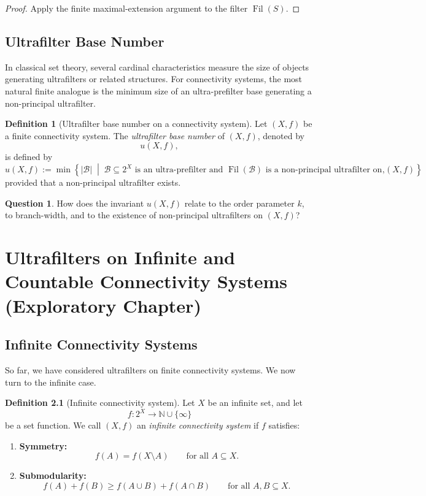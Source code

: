 \documentclass[10pt]{book}
\theoremstyle{definition}
\newtheorem{definition}[theorem]{Definition}
\newtheorem{question}[theorem]{Question}
\begin{document}
\begin{proof}
Apply the finite maximal-extension argument to the filter \(\operatorname{Fil}(S)\).
\end{proof}

\section{Ultrafilter Base Number}

In classical set theory, several cardinal characteristics measure the size of objects generating ultrafilters or related structures.
For connectivity systems, the most natural finite analogue is the minimum size of an ultra-prefilter base generating a non-principal ultrafilter.

\begin{definition}[Ultrafilter base number on a connectivity system]
Let \((X,f)\) be a finite connectivity system.
The \emph{ultrafilter base number} of \((X,f)\), denoted by
\[
u(X,f),
\]
is defined by
\[
u(X,f)
:=
\min
\left\{
|\mathcal{B}|
\;\middle|\;
\mathcal{B}\subseteq 2^X
\text{ is an ultra-prefilter and }
\operatorname{Fil}(\mathcal{B})
\text{ is a non-principal ultrafilter on }(X,f)
\right\},
\]
provided that a non-principal ultrafilter exists.
\end{definition}

\begin{question}
How does the invariant \(u(X,f)\) relate to the order parameter \(k\), to branch-width, and to the existence of non-principal ultrafilters on \((X,f)\)?
\end{question}

\newpage

\chapter{Ultrafilters on Infinite and Countable Connectivity Systems
(Exploratory Chapter) }

\section{Infinite Connectivity Systems}
So far, we have considered ultrafilters on finite connectivity systems.
We now turn to the infinite case.

\begin{definition}[Infinite connectivity system]
\label{def:infinite_connectivity_system}
Let \(X\) be an infinite set, and let
\[
f:2^X \to \mathbb{N}\cup\{\infty\}
\]
be a set function.
We call \((X,f)\) an \emph{infinite connectivity system} if \(f\) satisfies:
\begin{enumerate}
    \item \textbf{Symmetry:}
    \[
    f(A)=f(X\setminus A)
    \qquad\text{for all } A\subseteq X.
    \]
    \item \textbf{Submodularity:}
    \[
    f(A)+f(B)\geq f(A\cup B)+f(A\cap B)
    \qquad\text{for all } A,B\subseteq X.
    \]
\end{enumerate}
\end{definition}
\end{document}
